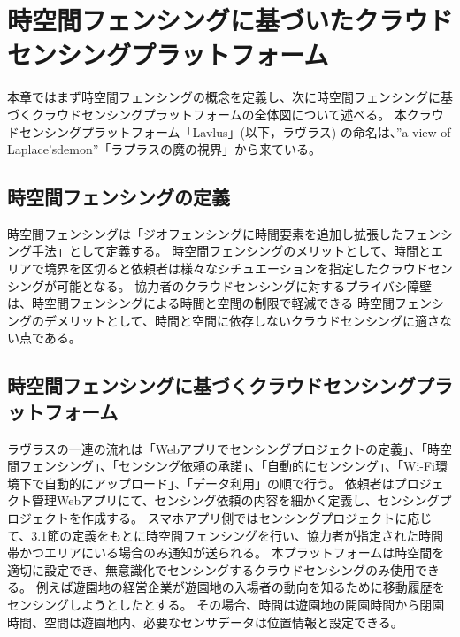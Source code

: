 \chapter{時空間フェンシングに基づいたクラウドセンシングプラットフォーム}
\thispagestyle{myheadings}
本章ではまず時空間フェンシングの概念を定義し、次に時空間フェンシングに基づくクラウドセンシングプラットフォームの全体図について述べる。
本クラウドセンシングプラットフォーム「Lavlus」(以下，ラヴラス) の命名は、”a view of Laplace’sdemon”「ラプラスの魔の視界」から来ている。

\section{時空間フェンシングの定義}
時空間フェンシングは「ジオフェンシングに時間要素を追加し拡張したフェンシング手法」として定義する。
時空間フェンシングのメリットとして、時間とエリアで境界を区切ると依頼者は様々なシチュエーションを指定したクラウドセンシングが可能となる。
協力者のクラウドセンシングに対するプライバシ障壁は、時空間フェンシングによる時間と空間の制限で軽減できる
時空間フェンシングのデメリットとして、時間と空間に依存しないクラウドセンシングに適さない点である。

\section{時空間フェンシングに基づくクラウドセンシングプラットフォーム}
ラヴラスの一連の流れは「Webアプリでセンシングプロジェクトの定義」、「時空間フェンシング」、「センシング依頼の承諾」、「自動的にセンシング」、「Wi-Fi環境下で自動的にアップロード」、「データ利用」の順で行う。
依頼者はプロジェクト管理Webアプリにて、センシング依頼の内容を細かく定義し、センシングプロジェクトを作成する。
スマホアプリ側ではセンシングプロジェクトに応じて、3.1節の定義をもとに時空間フェンシングを行い、協力者が指定された時間帯かつエリアにいる場合のみ通知が送られる。
本プラットフォームは時空間を適切に設定でき、無意識化でセンシングするクラウドセンシングのみ使用できる。
例えば遊園地の経営企業が遊園地の入場者の動向を知るために移動履歴をセンシングしようとしたとする。
その場合、時間は遊園地の開園時間から閉園時間、空間は遊園地内、必要なセンサデータは位置情報と設定できる。



